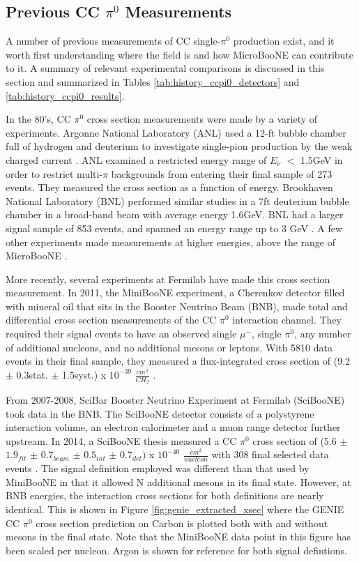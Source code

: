 \subsection{Previous CC $\pi^0$ Measurements}
A number of previous measurements of CC single-$\pi^0$ production exist, and it worth first understanding where the field is and how MicroBooNE can contribute to it. A summary of relevant experimental comparisons is discussed in this section and summarized in Tables \ref{tab:history_ccpi0_detectors} and \ref{tab:history_ccpi0_results}.
\par In the 80's, CC $\pi^0$ cross section measurements were made by a variety of experiments.  Argonne National Laboratory (ANL) used a 12-ft bubble chamber full of hydrogen and deuterium to investigate single-pion production by the weak charged current \cite{bib:ANL1}. ANL examined a restricted energy range of $E_\nu$ $<$ 1.5GeV in order to restrict multi-$\pi$ backgrounds from entering their final sample of 273 events. They measured the cross section as a function of energy. Brookhaven National Laboratory (BNL) performed similar studies in a 7ft deuterium bubble chamber in a broad-band beam with average energy 1.6GeV. BNL had a larger signal sample of 853 events, and spanned an energy range up to 3 GeV \cite{bib:ANL2} \cite{bib:BNL}. A few other experiments made measurements at higher energies, above the range of MicroBooNE \cite{bib:HE_unknown1} \cite{bib:HE_unknown2}.
\par More recently, several experiments at Fermilab have made this cross section measurement. In 2011, the MiniBooNE experiment, a Cherenkov detector filled with mineral oil that sits in the Booster Neutrino Beam (BNB), made total and differential cross section measurements of the CC $\pi^0$ interaction channel. They required their signal events to have an observed single $\mu^-$, single $\pi^0$, any number of additional nucleons, and no additional mesons or leptons. With 5810 data events in their final sample, they measured a flux-integrated cross section of (9.2 $\pm$ 0.3stat. $\pm$ 1.5syst.) x $10^{-39}$ $\frac{cm^2}{CH_2}$ \cite{bib:numucc_miniboone} \cite{bib:miniboone_thesis}.  
\par From 2007-2008, SciBar Booster Neutrino Experiment at Fermilab (SciBooNE) took data in the BNB. The SciBooNE detector consists of a polystyrene interaction volume, an electron calorimeter and a muon range detector further upstream.  In 2014, a SciBooNE thesis measured a CC $\pi^0$ cross section of (5.6 $\pm$ $1.9_{fit}$ $\pm$ $0.7_{beam}$ $\pm$ $0.5_{int}$ $\pm$ $0.7_{det})$ x $10^{-40}$ $\frac{cm^2}{nucleon}$ with 308 final selected data events \cite{bib:sciboone_thesis}. The signal definition employed was different than that used by MiniBooNE in that it allowed N additional mesons in its final state.  However, at BNB energies, the interaction cross sections for both definitions are nearly identical. This is shown in Figure \ref{fig:genie_extracted_xsec} where the GENIE CC $\pi^0$ cross section prediction on Carbon is plotted both with and without mesons in the final state.  Note that the MiniBooNE data point in this figure has been scaled per nucleon. Argon is shown for reference for both signal defintions.


